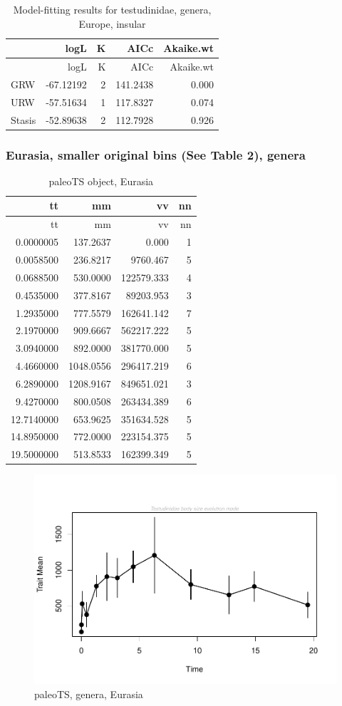 \documentclass[]{article}
\begin{document}
\begin{longtable}[]{@{}lrrrr@{}}
\caption{Model-fitting results for testudinidae, genera, Europe,
insular}\tabularnewline
\toprule
& logL & K & AICc & Akaike.wt\tabularnewline
\midrule
\endfirsthead
\toprule
& logL & K & AICc & Akaike.wt\tabularnewline
\midrule
\endhead
GRW & -67.12192 & 2 & 141.2438 & 0.000\tabularnewline
URW & -57.51634 & 1 & 117.8327 & 0.074\tabularnewline
Stasis & -52.89638 & 2 & 112.7928 & 0.926\tabularnewline
\bottomrule
\end{longtable}

\newpage 

\subsubsection{Eurasia, smaller original bins (See Table 2),
genera}\label{eurasia-smaller-original-bins-see-table-2-genera}

\begin{longtable}[]{@{}rrrr@{}}
\caption{paleoTS object, Eurasia}\tabularnewline
\toprule
tt & mm & vv & nn\tabularnewline
\midrule
\endfirsthead
\toprule
tt & mm & vv & nn\tabularnewline
\midrule
\endhead
0.0000005 & 137.2637 & 0.000 & 1\tabularnewline
0.0058500 & 236.8217 & 9760.467 & 5\tabularnewline
0.0688500 & 530.0000 & 122579.333 & 4\tabularnewline
0.4535000 & 377.8167 & 89203.953 & 3\tabularnewline
1.2935000 & 777.5579 & 162641.142 & 7\tabularnewline
2.1970000 & 909.6667 & 562217.222 & 5\tabularnewline
3.0940000 & 892.0000 & 381770.000 & 5\tabularnewline
4.4660000 & 1048.0556 & 296417.219 & 6\tabularnewline
6.2890000 & 1208.9167 & 849651.021 & 3\tabularnewline
9.4270000 & 800.0508 & 263434.389 & 6\tabularnewline
12.7140000 & 653.9625 & 351634.528 & 5\tabularnewline
14.8950000 & 772.0000 & 223154.375 & 5\tabularnewline
19.5000000 & 513.8533 & 162399.349 & 5\tabularnewline
\bottomrule
\end{longtable}

\begin{figure}[htbp]
\centering
\includegraphics{MA_JJ_files/figure-latex/paleoTSEurasia-1.pdf}
\caption{paleoTS, genera, Eurasia}
\end{figure}
\end{document}
